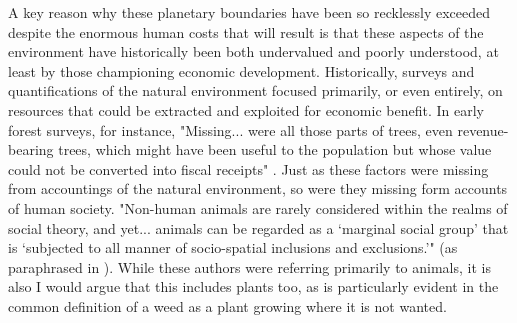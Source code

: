 \documentclass[notitlepage]{article}
\begin{document}
%
%
%
%

A key reason why these planetary boundaries have been so recklessly exceeded despite the enormous human costs that will result is that these aspects of the environment have historically been both undervalued and poorly understood, at least by those championing economic development. Historically, surveys and quantifications of the natural environment focused primarily, or even entirely, on resources that could be extracted and exploited for economic benefit. In early forest surveys, for instance, "Missing... were all those parts of trees, even revenue-bearing trees, which might have been useful to the population but whose value could not be converted into fiscal receipts" \cite{scottSeeingStateHow2020}. Just as these factors were missing from accountings of the natural environment, so were they missing form accounts of human society. "Non-human animals are rarely considered within the realms of social theory, and yet... animals can be regarded as a `marginal social group' that is `subjected to all manner of socio-spatial inclusions and exclusions.'" (\cite{philolAnimalsGeographyCity1995,westcoatBringingAnimalsBack1995,wolchAnimalGeographiesPlace1998}as paraphrased in \cite{harrisRethinkingMapsMorethanhuman2011}). While these authors were referring primarily to animals, it is also  I would argue that this includes plants too, as is particularly evident in the common definition of a weed as a plant growing where it is not wanted.
\end{document}
